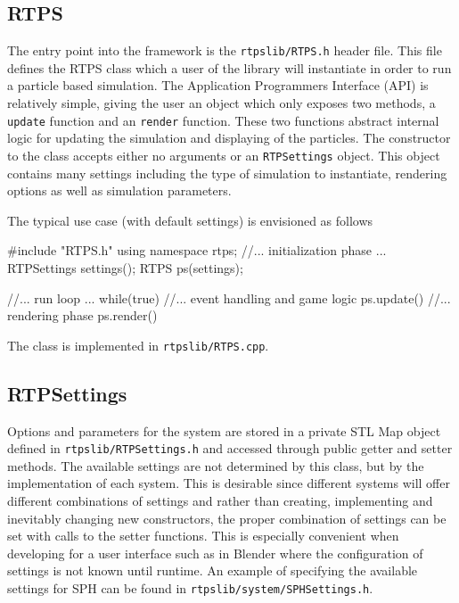 \subsection{RTPS}

The entry point into the framework is the \verb|rtpslib/RTPS.h| header file. This file defines
the RTPS class which a user of the library will instantiate in order to run a
particle based simulation. The Application Programmers Interface (API) is
relatively simple, giving the user an object which only exposes two methods, a
\verb|update| function and an \verb|render| function. These two functions abstract
internal logic for updating the simulation and displaying of the particles. The
constructor to the class accepts either no arguments or an \verb|RTPSettings| object.
This object contains many settings including the type of simulation to
instantiate, rendering options as well as simulation parameters. 

The typical use case (with default settings) is envisioned as follows
\begin{cppcode}{0}
#include "RTPS.h"
using namespace rtps;
//... initialization phase ...
RTPSettings settings();
RTPS ps(settings);

//... run loop ...
while(true)
{
    //... event handling and game logic
    ps.update()
    //... rendering phase
    ps.render()
}

\end{cppcode}

The class is implemented in \verb|rtpslib/RTPS.cpp|.

\subsection{RTPSettings}

Options and parameters for the system are stored in a private STL Map object
defined in \verb|rtpslib/RTPSettings.h| and accessed through public getter and
setter methods. The available settings are not determined by this class, but by
the implementation of each system. This is desirable since different systems
will offer different combinations of settings and rather than creating,
implementing and inevitably changing new constructors, the proper combination
of settings can be set with calls to the setter functions. This is especially
convenient when developing for a user interface such as in Blender where the
configuration of settings is not known until runtime.  
An example of specifying the available settings for SPH can be found in
\verb|rtpslib/system/SPHSettings.h|.


